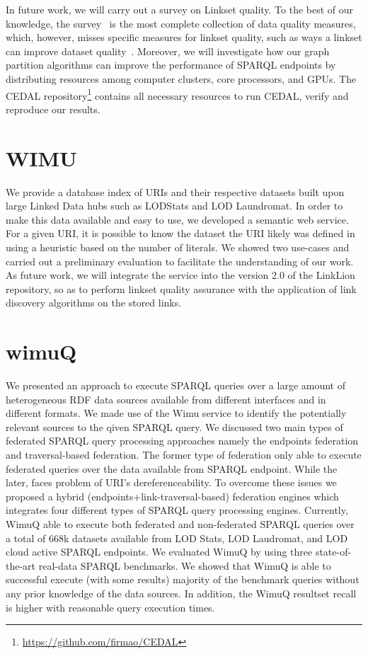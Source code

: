 In future work, we will carry out a survey on Linkset quality. To the best of our knowledge, the survey~\cite{zaveri2015quality} is the most complete collection of data quality measures, which, however, misses specific measures for linkset quality, such as ways a linkset can improve dataset quality~\cite{Albertoni:2013:ALQ:2457317.2457327,yaghouti2015metric,casanova2014materialized}.
Moreover, we will investigate how our graph partition algorithms can improve the performance of SPARQL endpoints by distributing resources among computer clusters, core processors, and GPUs.
The CEDAL repository\footnote{\url{https://github.com/firmao/CEDAL}} contains all necessary resources to run CEDAL, verify and reproduce our results.

\section{WIMU}
We provide a database index of URIs and their respective datasets built upon large Linked Data hubs such as LODStats and LOD Laundromat.
In order to make this data available and easy to use, we developed a semantic web service.
For a given URI, it is possible to know the dataset the URI likely was defined in using a heuristic based on the number of literals. 
We showed two use-cases and carried out a preliminary evaluation to facilitate the understanding of our work.
As future work, we will integrate the service into the version 2.0 of the LinkLion repository, so as to perform linkset quality assurance with the application of link discovery algorithms on the stored links.

\section{wimuQ}
We presented an approach to execute SPARQL queries over a large amount of heterogeneous RDF data sources available from different interfaces and in different formats. We made use of the Wimu service to identify the potentially relevant sources to the qiven SPARQL query. We discussed two main types of federated SPARQL query processing approaches namely the endpoints federation and traversal-based federation. The former type of federation only able to execute federated queries over the data available from SPARQL endpoint. While the later, faces problem of URI's dereferenceability. To overcome these issues we proposed a hybrid (endpoints+link-traversal-based) federation engines which integrates four different types of SPARQL query processing engines. Currently, WimuQ able to execute both federated and non-federated SPARQL queries over a total of 668k datasets available from LOD Stats, LOD Laudromat, and LOD cloud active SPARQL endpoints. We evaluated WimuQ by using three state-of-the-art real-data SPARQL benchmarks. We showed that WimuQ is able to successful execute (with some results) majority of the benchmark queries without any prior knowledge of the data sources. In addition, the WimuQ resultset recall is higher with reasonable query execution times. 

